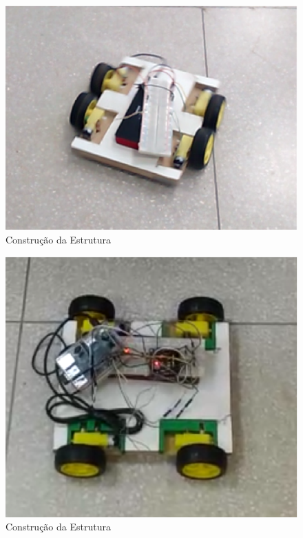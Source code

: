\begin{apendicesenv}
\begin{figure}[H]
    \centering
    \includegraphics[width=1\textwidth]{figuras/montagem_1.eps}
    \caption{Construção da Estrutura}
    \label{fig:montagem_1}
\end{figure}

\begin{figure}[H]
    \centering
    \includegraphics[width=1\textwidth]{figuras/montagem_2.eps}
    \caption{Construção da Estrutura}
    \label{fig:montagem_2}
\end{figure}

\end{apendicesenv}

